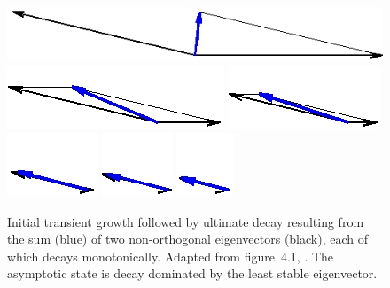 \documentclass[11pt,a4paper]{report}
\begin{document}
\begin{figure}
\begin{center}
\includegraphics[height=0.055\textwidth]{nn0000.png}
\includegraphics[height=0.055\textwidth]{nn0025.png}
\includegraphics[height=0.055\textwidth]{nn0040.png}
\includegraphics[height=0.055\textwidth]{nn0070.png}
\includegraphics[height=0.055\textwidth]{nn0080.png}
\includegraphics[height=0.055\textwidth]{nn0100.png}
\end{center}
\caption{Initial transient growth followed by ultimate decay resulting
  from the sum (blue) of two non-orthogonal eigenvectors (black), each
  of which decays monotonically.  Adapted from figure~4.1,
  \cite{schmid01}. The asymptotic state is decay dominated by the
  least stable eigenvector. }
\label{fig.tg}
\end{figure}
\end{document}
